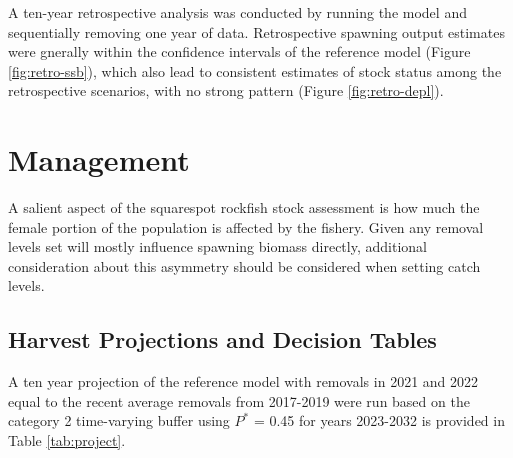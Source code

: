 \documentclass[11pt,
  english,
  a4paper,
]{article}
\begin{document}

A ten-year retrospective analysis was conducted by running the model and sequentially removing one year of data. Retrospective spawning output estimates were gnerally within the confidence intervals of the reference model (Figure \ref{fig:retro-ssb}), which also lead to consistent estimates of stock status among the retrospective scenarios, with no strong pattern (Figure \ref{fig:retro-depl}).

\leavevmode\tagmcend\tagstructend\par


\hypertarget{management}{%
\section{Management}\label{management}}

\leavevmode\tagmcend\tagstructend


A salient aspect of the squarespot rockfish stock assessment is how much the female portion of the population is affected by the fishery. Given any removal levels set will mostly influence spawning biomass directly, additional consideration about this asymmetry should be considered when setting catch levels.

\leavevmode\tagmcend\tagstructend\par


\hypertarget{harvest-projections-and-decision-tables}{%
\subsection{Harvest Projections and Decision Tables}\label{harvest-projections-and-decision-tables}}

\leavevmode\tagmcend\tagstructend


A ten year projection of the reference model with removals in 2021 and 2022 equal to the recent average removals from 2017-2019 were run based on the category 2 time-varying buffer using {\(P^*\)\leavevmode\tagmcend\tagstructend} = 0.45 for years 2023-2032 is provided in Table \ref{tab:project}.
\end{document}
